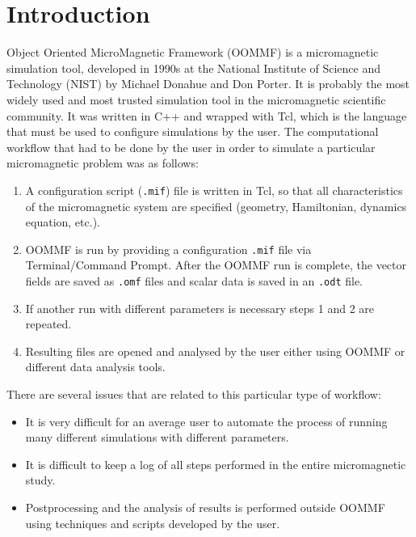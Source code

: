 \documentclass{deliverablereport}
\author{Marijan Beg and Hans Fangohr}
\begin{document}
\maketitle
\githubissuedescription
\newpage
\tableofcontents
\newpage

\section{Introduction}

Object Oriented MicroMagnetic Framework (OOMMF) is a micromagnetic simulation tool, developed in 1990s at the National Institute of Science and Technology (NIST) by Michael Donahue and Don Porter. It is probably the most widely used and most trusted simulation tool in the micromagnetic scientific community. It was written in C++ and wrapped with Tcl, which is the language that must be used to configure simulations by the user. The computational workflow that had to be done by the user in order to simulate a particular micromagnetic problem was as follows:

\begin{enumerate}
\item A configuration script (\texttt{.mif}) file is written in Tcl, so that all characteristics of the micromagnetic system are specified (geometry, Hamiltonian, dynamics equation, etc.).
\item OOMMF is run by providing a configuration \texttt{.mif} file via Terminal/Command Prompt. After the OOMMF run is complete, the vector fields are saved as \texttt{.omf} files and scalar data is saved in an \texttt{.odt} file.
\item If another run with different parameters is necessary steps 1 and 2 are repeated.
\item Resulting files are opened and analysed by the user either using OOMMF or different data analysis tools.
\end{enumerate}

There are several issues that are related to this particular type of workflow:
\begin{itemize}
\item It is very difficult for an average user to automate the process of running many different simulations with different parameters.
\item It is difficult to keep a log of all steps performed in the entire micromagnetic study.
\item Postprocessing and the analysis of results is performed outside OOMMF using techniques and scripts developed by the user.
\end{itemize}
\end{document}
